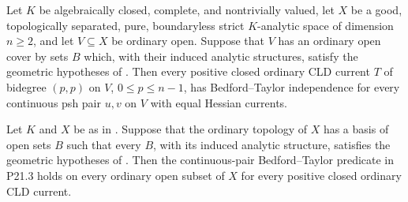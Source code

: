 \begin{corollary}
\label{cor:p213-residual-picard-stage-local-annular-tower-cover-bt}
Let $K$ be algebraically closed, complete, and nontrivially valued, let
$X$ be a good, topologically separated, pure, boundaryless strict
$K$-analytic space of dimension $n\geq2$, and let $V\subseteq X$ be
ordinary open.  Suppose that $V$ has an ordinary open cover by sets $B$
which, with their induced analytic structures, satisfy the geometric
hypotheses of
.  Then every
positive closed ordinary CLD current $T$ of bidegree $(p,p)$ on $V$,
$0\leq p\leq n-1$, has Bedford--Taylor independence for every continuous
psh pair $u,v$ on $V$ with equal Hessian currents.
\end{corollary}

\begin{corollary}
\label{cor:p213-residual-picard-stage-local-annular-tower-basis-bt}
Let $K$ and $X$ be as in
.
Suppose that the ordinary topology of $X$ has a basis of open sets $B$ such
that every $B$, with its induced analytic structure, satisfies the
geometric hypotheses of
.  Then the
continuous-pair Bedford--Taylor predicate in P21.3 holds on every ordinary
open subset of $X$ for every positive closed ordinary CLD current.
\end{corollary}

